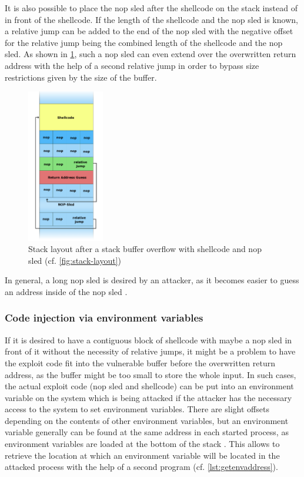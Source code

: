 It is also possible to place the \acs{nop} sled after the shellcode on the stack instead of in front of the shellcode.
If the length of the shellcode and the \acs{nop} sled is known, a relative jump can be added to the end of the \acs{nop} sled with the negative offset for the relative jump being the combined length of the shellcode and the \acs{nop} sled.
As shown in \cref{fig:stack-overflow-nop-sled}, such a \acs{nop} sled can even extend over the overwritten return address with the help of a second relative jump in order to bypass size restrictions given by the size of the buffer.

\begin{figure}[htb]
	\centering
	\includegraphics[width=0.3\textwidth]{figures/NopSled}
	\caption{Stack layout after a stack buffer overflow with shellcode and \acs{nop} sled \cite{Lynn2007c} (cf. \cref{fig:stack-layout})}
	\label{fig:stack-overflow-nop-sled}
\end{figure}

In general, a long \acs{nop} sled is desired by an attacker, as it becomes easier to guess an address inside of the \acs{nop} sled \cite{AlephOne1996}.

\subsubsection{Code injection via environment variables}
\label{subsubsec:ci-via-env-variable}

If it is desired to have a contiguous block of shellcode with maybe a \acs{nop} sled in front of it without the necessity of relative jumps, it might be a problem to have the exploit code fit into the vulnerable buffer before the overwritten return address, as the buffer might be too small to store the whole input.
In such cases, the actual exploit code (\acs{nop} sled and shellcode) can be put into an environment variable on the system which is being attacked if the attacker has the necessary access to the system to set environment variables.
There are slight offsets depending on the contents of other environment variables, but an environment variable generally can be found at the same address in each started process, as environment variables are loaded at the bottom of the stack \cite[731\psq]{Bryant2011}.
This allows to retrieve the location at which an environment variable will be located in the attacked process with the help of a second program (cf. \cref{lst:getenvaddress}).

